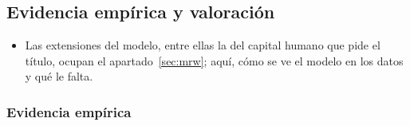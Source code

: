 \documentclass[11pt]{article}
\begin{document}
\subsection{Evidencia empírica y valoración}\label{sec:solow-valoracion}

\begin{itemize}
\item Las extensiones del modelo, entre ellas la del capital humano que pide el título, ocupan el apartado~\ref{sec:mrw}; aquí, cómo se ve el modelo en los datos y qué le falta.
\end{itemize}

\subsubsection{Evidencia empírica}
\end{document}
